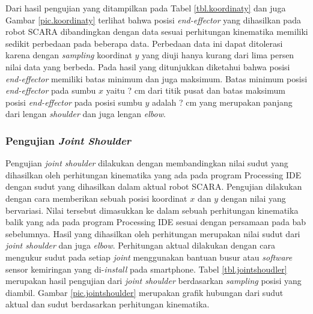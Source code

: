 Dari hasil pengujian yang ditampilkan pada Tabel \ref{tbl.koordinaty} dan juga Gambar \ref{pic.koordinaty} terlihat bahwa posisi \textit{end-effector} yang dihasilkan pada robot SCARA dibandingkan dengan data sesuai perhitungan kinematika memiliki sedikit perbedaan pada beberapa data. Perbedaan data ini dapat ditolerasi karena dengan \textit{sampling} koordinat $y$ yang diuji hanya kurang dari lima persen nilai data yang berbeda. Pada hasil yang ditunjukkan diketahui bahwa posisi \textit{end-effector} memiliki batas minimum dan juga maksimum. Batas minimum posisi \textit{end-effector} pada sumbu $x$ yaitu ? cm dari titik pusat dan batas maksimum posisi \textit{end-effector} pada posisi sumbu $y$ adalah ? cm yang merupakan panjang dari lengan \textit{shoulder} dan juga lengan \textit{elbow}. 

\subsubsection{Pengujian \textit{Joint Shoulder}}
Pengujian \textit{joint shoulder} dilakukan dengan membandingkan nilai sudut yang dihasilkan oleh perhitungan kinematika yang ada pada program Processing IDE dengan sudut yang dihasilkan dalam aktual robot SCARA. Pengujian dilakukan dengan cara memberikan sebuah posisi koordinat $x$ dan $y$ dengan nilai yang bervariasi. Nilai tersebut dimasukkan ke dalam sebuah perhitungan kinematika balik yang ada pada program Processing IDE sesuai dengan persamaan pada bab sebelumnya. Hasil yang dihasilkan oleh perhitungan merupakan nilai sudut dari \textit{joint shoulder} dan juga \textit{elbow}. Perhitungan aktual dilakukan dengan cara mengukur sudut pada setiap \textit{joint} menggunakan bantuan busur atau \textit{software} sensor kemiringan yang di-\textit{install} pada smartphone. Tabel \ref{tbl.jointshoudler} merupakan hasil pengujian dari \textit{joint shoulder} berdasarkan \textit{sampling} posisi yang diambil. Gambar \ref{pic.jointshoulder} merupakan grafik hubungan dari sudut aktual dan sudut berdasarkan perhitungan kinematika. 

